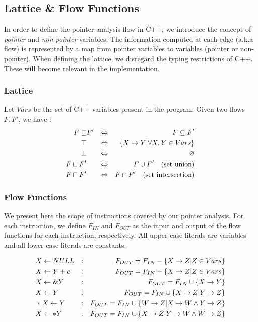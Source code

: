\subsection{Lattice \& Flow Functions}
In order to define the pointer analysis flow in C++, we introduce the concept of \emph{pointer} and \emph{non-pointer} variables. The information computed at each edge (a.k.a flow) is represented by a map from pointer variables to variables (pointer or non-pointer). When defining the lattice, we disregard the typing restrictions of C++. These will become relevant in the implementation. 
\subsubsection{Lattice}
Let $Vars$ be the set of C++ variables present in the program. Given two flows $F,F'$, we have :
\begin{align*}
F \sqsubseteq & F'  & \Leftrightarrow & & F \subseteq F' \\
\top & & \Leftrightarrow & & \{ X \rightarrow Y | \forall X,Y \in Vars \}\\ 
\bot & & \Leftrightarrow & & \varnothing \\ 
F \sqcup F' & & \Leftrightarrow &  & F \cup F' \quad \text{(set union)} \\
F \sqcap F' & & \Leftrightarrow & & F \cap F' \quad \text{(set intersection)}
\end{align*}
\subsubsection{Flow Functions}
We present here the scope of instructions covered by our pointer analysis. For each instruction, we define $F_{IN}$ and $F_{OUT}$ as the input and output of the flow functions for each instruction, respectively. All upper case literals are variables and all lower case literals are constants.

\begin{align*} 
& X \leftarrow NULL & : & & F_{OUT} = F_{IN} - \{X \rightarrow Z | Z \in Vars \} \\
& X \leftarrow Y + c & : & & F_{OUT} = F_{IN} - \{X \rightarrow Z | Z \in Vars \} \\
& X \leftarrow \&Y & : & & F_{OUT} = F_{IN} \cup \{X \rightarrow Y \} \\
& X \leftarrow Y & : & & F_{OUT} = F_{IN} \cup \{X \rightarrow Z | Y \rightarrow Z \} \\
& *X \leftarrow Y & : & & F_{OUT} = F_{IN} \cup \{W \rightarrow Z | X \rightarrow W \wedge Y \rightarrow Z \} \\
& X \leftarrow *Y & : & & F_{OUT} = F_{IN} \cup \{X \rightarrow Z | Y \rightarrow W \wedge W \rightarrow Z \} 
\end{align*}
%

